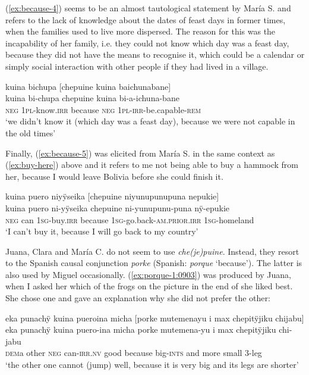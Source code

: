 (\ref{ex:because-4}) seems to be an almost tautological statement by María S. and refers to the lack of knowledge about the dates of feast days in former times, when the families used to live more dispersed. The reason for this was the incapability of her family, i.e. they could not know which day was a feast day, because they did not have the means to recognise it, which could be a calendar or simply social interaction with other people if they had lived in a village.

\ea\label{ex:because-4}
\begingl
\glpreamble kuina bichupa \textup{[}chepuine kuina baichunabane\textup{]}\\
\gla kuina bi-chupa chepuine kuina bi-a-ichuna-bane\\
\glb \textsc{neg} 1\textsc{pl}-know.\textsc{irr} because \textsc{neg} 1\textsc{pl}-\textsc{irr}-be.capable-\textsc{rem}\\
\glft ‘we didn’t know it (which day was a feast day), because we were not capable in the old times’
\endgl
\trailingcitation{[rxx-p181101l-2.016]}
\xe

Finally, (\ref{ex:because-5}) was elicited from María S. in the same context as (\ref{ex:buy-here}) above and it refers to me not being able to buy a hammock from her, because I would leave Bolivia before she could finish it.
 
 \ea\label{ex:because-5}
\begingl
\glpreamble kuina puero niyÿseika \textup{[}chepuine niyunupunupuna nepukie\textup{]}\\
\gla kuina puero ni-yÿseika chepuine ni-yunupunu-puna nÿ-epukie\\
\glb \textsc{neg} can 1\textsc{sg}-buy.\textsc{irr} because 1\textsc{sg}-go.back-\textsc{am.prior.irr} 1\textsc{sg}-homeland\\
\glft ‘I can’t buy it, because I will go back to my country’
\endgl
\trailingcitation{[rxx-e181022le]}
\xe

Juana, Clara and María C. do not seem to use \textit{che(je)puine}. Instead, they resort to the Spanish causal conjunction \textit{porke} (Spanish: \textit{porque} ‘because’). The latter is also used by Miguel occasionally. (\ref{ex:porque-1:0903}) was produced by Juana, when I asked her which of the frogs on the picture in the end of  she liked best. She chose one and gave an explanation why she did not prefer the other:

\ea\label{ex:porque-1:0903}
\begingl
\glpreamble eka punachÿ kuina pueroina micha \textup{[}porke mutemenayu i max chepitÿjiku chijabu\textup{]}\\
\gla eka punachÿ kuina puero-ina micha porke mutemena-yu i max chepitÿjiku chi-jabu\\
\glb \textsc{dem}a other \textsc{neg} can-\textsc{irr.nv} good because big-\textsc{ints} and more small 3-leg\\
\glft ‘the other one cannot (jump) well, because it is very big and its legs are shorter’
\endgl
\trailingcitation{[jxx-a120516l-a.529-531]}
\xe

